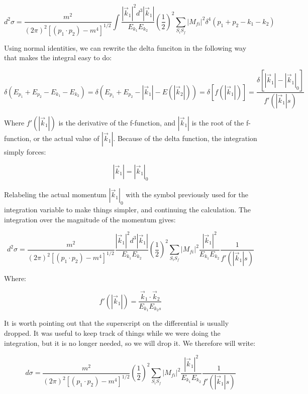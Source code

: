 \documentclass[a4]{article}
\begin{document}
    \begin{equation}
        d^2 \sigma = \frac{m^2}{(2 \pi)^2 [(p_1 \cdot p_2) - m^4]^{1/2}} \int \frac{|\vec{k}_1|^2 d^3 |\vec{k}_1|}{E_{k_1} E_{k_2}} (\frac{1}{2})^2 \sum_{S_i S_f} |M_{fi}|^2 \delta^4 (p_1 + p_2 - k_1 - k_2)
    \end{equation}
    
    Using normal identities, we can rewrite the delta funciton in the following way that makes the integral easy to do:

    \begin{equation}
        \delta (E_{p_1} + E_{p_2} - E_{k_1} - E_{k_2}) = \delta (E_{p_1} + E_{p_2} - |\vec{k}_1| - E (|\vec{k}_2|) ) = \delta [f (|\vec{k}_1|)] = \frac{\delta [|\vec{k}_1| - |\vec{k}_1|_0]}{f' (|\vec{k}_1|s)}
    \end{equation}

    Where $f'(|\vec{k}_1|)$ is the derivative of the f-function, and $|\vec{k}_1|$ is the root of the f-function, or the actual value of $|\vec{k}_1|$. Because of the delta function, the integration simply forces:

    \[
        |\vec{k}_1| = |\vec{k}_1|_0
    \]

    Relabeling the actual momentum $|\vec{k}_1|_0$ with the symbol previously used for the integration variable to make things simpler, and continuing the calculation. The integration over the magnitude of the momentum gives:

    \begin{equation}
        d^2 \sigma = \frac{m^2}{(2 \pi)^2 [(p_1 \cdot p_2) - m^4]^{1/2}} \frac{|\vec{k}_1|^2 d^3 |\vec{k}_1|}{E_{k_1} E_{k_2}} (\frac{1}{2})^2 \sum_{S_i S_f} |M_{fi}|^2 \frac{|\vec{k}_1|^2}{E_{k_1} E_{k_2}} \frac{1}{f' (|\vec{k}_1|s)}
    \end{equation}

    Where:

    \begin{equation}
        f' (|\vec{k}_1|) = \frac{\vec{k}_1 \cdot \vec{k}_2}{E_{k_1} E_{k_2s}}
    \end{equation}

    It is worth pointing out that the superscript on the differential is usually dropped. It was useful to keep track of things while we were doing the integration, but it is no longer needed, so we will drop it. We therefore will write:
    
    \begin{equation}
        d \sigma = \frac{m^2}{(2 \pi)^2 [(p_1 \cdot p_2) - m^4]^{1/2}} (\frac{1}{2})^2 \sum_{S_i S_f} |M_{fi}|^2 \frac{|\vec{k}_1|^2}{E_{k_1} E_{k_2}} \frac{1}{f' (|\vec{k}_1|s)}
    \end{equation}
\end{document}
